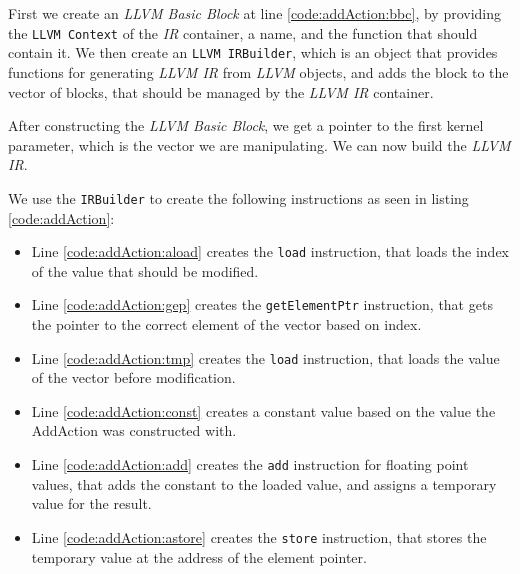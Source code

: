 First we create an \textit{LLVM Basic Block} at line \ref{code:addAction:bbc}, by providing the \texttt{LLVM Context} of the \textit{IR} container, a name, and the function that should contain it. We then create an \texttt{LLVM IRBuilder}, which is an object that provides functions for generating \textit{LLVM IR} from \textit{LLVM} objects, and adds the block to the vector of blocks, that should be managed by the \textit{LLVM IR} container.

After constructing the \textit{LLVM Basic Block}, we get a pointer to the first kernel parameter, which is the vector we are manipulating. We can now build the \textit{LLVM IR}.

We use the \texttt{IRBuilder} to create the following instructions as seen in listing \ref{code:addAction}:
\begin{itemize}
\item Line \ref{code:addAction:aload} creates the \texttt{load} instruction, that loads the index of the value that should be modified.
\item Line \ref{code:addAction:gep} creates the \texttt{getElementPtr} instruction, that gets the pointer to the correct element of the vector based on index.
\item Line \ref{code:addAction:tmp} creates the \texttt{load} instruction, that loads the value of the vector before modification.
\item Line \ref{code:addAction:const} creates a constant value based on the value the AddAction was constructed with.
\item Line \ref{code:addAction:add} creates the \texttt{add} instruction for floating point values, that adds the constant to the loaded value, and assigns a temporary value for the result.
\item Line \ref{code:addAction:astore} creates the \texttt{store} instruction, that stores the temporary value at the address of the element pointer.
\end{itemize}

